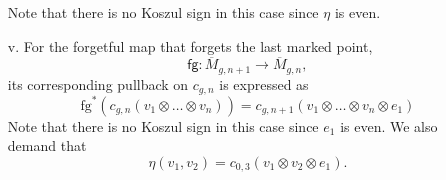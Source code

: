 \documentclass{amsart}
\numberwithin{equation}{section} %
\theoremstyle{plain}
\theoremstyle{remark}
\begin{document}
\begin{enumerate}
\begin{equation*}
\end{equation*}
Note that there is no Koszul sign in this case since $\eta$ is even. 
\item[v.] For the forgetful map that forgets the last marked point,
\begin{equation*}
\mathsf{fg}\colon \overline{M}_{g,n+1}\rightarrow \overline{M}_{g,n},
\end{equation*}
its corresponding pullback on $c_{g,n}$ is expressed as
\begin{equation*}
\mathrm{fg}^*(c_{g,n}(v_1\otimes \dots\otimes v_n))=c_{g,n+1}(v_1\otimes \dots\otimes v_n\otimes e_1)
\end{equation*}
Note that there is no Koszul sign in this case since $e_1$ is even. We also demand that 
\begin{equation*}
\eta(v_1,v_2)=c_{0,3}(v_1\otimes v_2\otimes e_1).
\end{equation*}
\end{enumerate}
﻿
\end{document}

